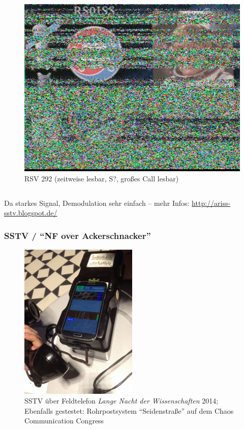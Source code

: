 \begin{frame}
\begin{columns}
    \begin{figure}
      \includegraphics[width=\textwidth,height=.5\textheight,keepaspectratio]{e16/SSTV-RS0ISS_2015-07-19.jpg}
      \caption{RSV 292 (zeitweise lesbar, S?, großes Call lesbar)}
    \end{figure}
  \end{columns}

  Da starkes Signal, Demodulation sehr einfach -- mehr Infos: \url{http://ariss-sstv.blogspot.de/}

\end{frame}

\begin{frame}
  \frametitle{SSTV / ``NF over Ackerschnacker''}

  \begin{center}
    \begin{figure}
      \includegraphics[width=0.5\textwidth,height=.6\textheight,keepaspectratio]{e16/SSTV-over-Ackerschnacker_LNDW2014.jpg}
      \caption{SSTV über Feldtelefon \emph{Lange Nacht der Wissenschaften} 2014; Ebenfalls gestestet: Rohrpostsystem ``Seidenstraße'' auf dem Chaos Communication Congress}
    \end{figure}
  \end{center}

\end{frame}

